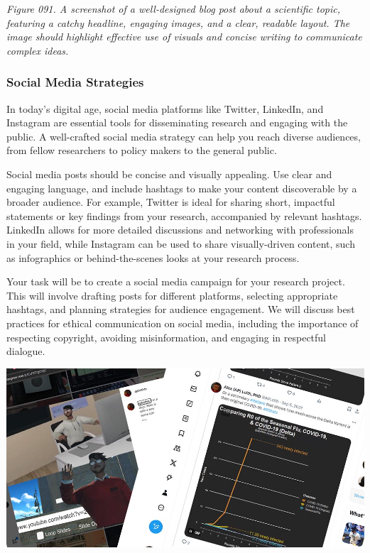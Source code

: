 \documentclass[
]{book}
\begin{document}
\emph{Figure 091. A screenshot of a well-designed blog post about a scientific topic, featuring a catchy headline, engaging images, and a clear, readable layout. The image should highlight effective use of visuals and concise writing to communicate complex ideas.}

\subsubsection{Social Media Strategies}\label{social-media-strategies}

In today's digital age, social media platforms like Twitter, LinkedIn, and Instagram are essential tools for disseminating research and engaging with the public. A well-crafted social media strategy can help you reach diverse audiences, from fellow researchers to policy makers to the general public.

Social media posts should be concise and visually appealing. Use clear and engaging language, and include hashtags to make your content discoverable by a broader audience. For example, Twitter is ideal for sharing short, impactful statements or key findings from your research, accompanied by relevant hashtags. LinkedIn allows for more detailed discussions and networking with professionals in your field, while Instagram can be used to share visually-driven content, such as infographics or behind-the-scenes looks at your research process.

Your task will be to create a social media campaign for your research project. This will involve drafting posts for different platforms, selecting appropriate hashtags, and planning strategies for audience engagement. We will discuss best practices for ethical communication on social media, including the importance of respecting copyright, avoiding misinformation, and engaging in respectful dialogue.

\includegraphics[width=1\textwidth,height=\textheight]{images/fig092.jpg}
\end{document}
